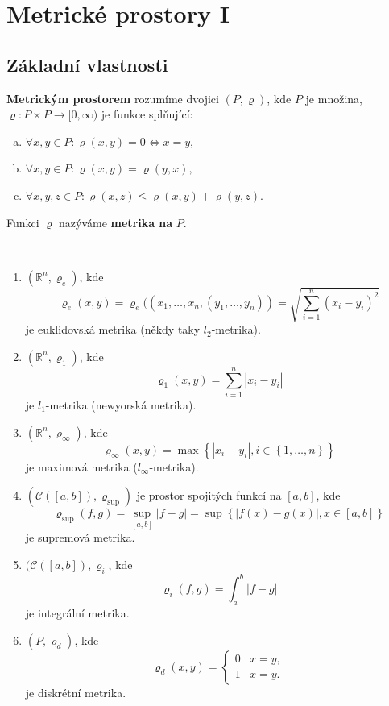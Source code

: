 \section{Metrické prostory I}
\subsection{Základní vlastnosti}
\begin{definice}
\textbf{Metrickým prostorem} rozumíme dvojici $(P, \varrho)$, kde $P$ je množina,
$
\varrho : P \times P \to [0,\infty)
$
je funkce splňující:
\begin{enumerate}[(a)]
    \item $\forall x,y \in P : \varrho(x,y)=0 \iff x=y,$
    \item $\forall x,y \in P : \varrho(x,y)=\varrho(y,x),$
    \item $\forall x,y,z \in P : \varrho(x,z)\leq \varrho(x,y)+\varrho(y,z).$
\end{enumerate}

Funkci $\varrho$ nazýváme \textbf{metrika na} $P$.
\end{definice}

\begin{priklad}\,
\begin{enumerate}[(1)]
	\item $(\mathbb R ^n, \varrho_e)$, kde
	$$\varrho_e(x,y) = \varrho_e((x_1,\dots,x_n,(y_1,\dots,y_n)) = \sqrt{\sum_{i=1}^n (x_i-y_i)^2}$$
	je euklidovská metrika (někdy taky $l_2$-metrika).
	\item $(\mathbb R ^n, \varrho_1)$, kde
	$$
	    \varrho_1(x,y)=\sum_{i=1}^{n} |x_i-y_i|
	$$
	je $l_1$-metrika (newyorská metrika).
	\item $(\mathbb R ^n,\varrho_\infty)$, kde
	$$
	    \varrho_\infty(x,y) = \max \left \{ |x_i-y_i|, i \in \left \{ 1,\dots, n \right \}  \right \}
	$$
	je maximová metrika ($l_\infty$-metrika).
	\item $(\mathscr C([a,b]), \varrho_{\sup{}})$ je prostor spojitých funkcí na $[a,b]$, kde
	$$
	    \varrho_{\sup} (f,g) = \sup_{[a,b]}|f-g| = \sup \left \{ |f(x)-g(x)|, x \in [a,b] \right \}
	$$
	je supremová metrika.
	\item $(\mathscr C([a,b]),\varrho_i$, kde
	$$
	    \varrho_i(f,g) = \int_a^b |f-g|
	$$
	je integrální metrika.
	\item $(P,\varrho_d)$, kde
	$$
	    \varrho_d(x,y) = \begin{cases}
						0 & x=y,\\
						1 & x=y.
					\end{cases}
	$$
	je diskrétní metrika.
\end{enumerate}
\end{priklad}

